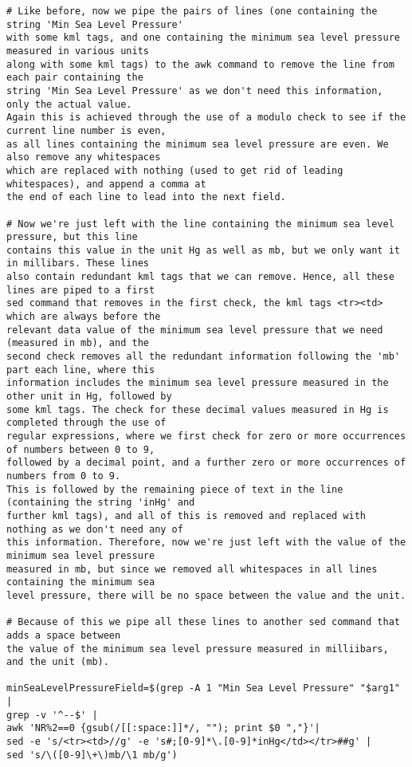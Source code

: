 \documentclass[]{article} %
\begin{document}
\begin{verbatim}
# Like before, now we pipe the pairs of lines (one containing the string 'Min Sea Level Pressure' 
with some kml tags, and one containing the minimum sea level pressure measured in various units 
along with some kml tags) to the awk command to remove the line from each pair containing the 
string 'Min Sea Level Pressure' as we don't need this information, only the actual value. 
Again this is achieved through the use of a modulo check to see if the current line number is even, 
as all lines containing the minimum sea level pressure are even. We also remove any whitespaces 
which are replaced with nothing (used to get rid of leading whitespaces), and append a comma at 
the end of each line to lead into the next field. 

# Now we're just left with the line containing the minimum sea level pressure, but this line 
contains this value in the unit Hg as well as mb, but we only want it in millibars. These lines 
also contain redundant kml tags that we can remove. Hence, all these lines are piped to a first 
sed command that removes in the first check, the kml tags <tr><td> which are always before the 
relevant data value of the minimum sea level pressure that we need (measured in mb), and the 
second check removes all the redundant information following the 'mb' part each line, where this 
information includes the minimum sea level pressure measured in the other unit in Hg, followed by 
some kml tags. The check for these decimal values measured in Hg is completed through the use of 
regular expressions, where we first check for zero or more occurrences of numbers between 0 to 9, 
followed by a decimal point, and a further zero or more occurrences of numbers from 0 to 9. 
This is followed by the remaining piece of text in the line (containing the string 'inHg' and 
further kml tags), and all of this is removed and replaced with nothing as we don't need any of 
this information. Therefore, now we're just left with the value of the minimum sea level pressure 
measured in mb, but since we removed all whitespaces in all lines containing the minimum sea 
level pressure, there will be no space between the value and the unit.

# Because of this we pipe all these lines to another sed command that adds a space between 
the value of the minimum sea level pressure measured in milliibars, and the unit (mb).

minSeaLevelPressureField=$(grep -A 1 "Min Sea Level Pressure" "$arg1" | 
grep -v '^--$' | 
awk 'NR%2==0 {gsub(/[[:space:]]*/, ""); print $0 ","}'| 
sed -e 's/<tr><td>//g' -e 's#;[0-9]*\.[0-9]*inHg</td></tr>##g' | 
sed 's/\([0-9]\+\)mb/\1 mb/g')


\end{verbatim}
\end{document}

